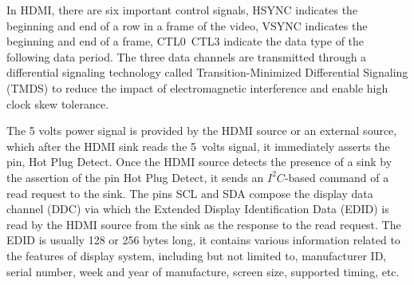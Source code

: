 \documentclass[]{spie}  %
\begin{document}

In HDMI, there are six important control signals, HSYNC indicates the beginning and end of a row in a frame of the video, VSYNC indicates the beginning and end of a frame, CTL0~CTL3 indicate the data type of the following data period. The three data channels are transmitted through a differential signaling technology called Transition-Minimized Differential Signaling (TMDS) to reduce the impact of electromagnetic interference and enable high clock skew tolerance. %

The 5 volts power signal is provided by the HDMI source or an external source, which after the HDMI sink reads the 5~volts signal, it immediately asserts the pin, Hot Plug Detect. Once the HDMI source detects the presence of a sink by the assertion of the pin Hot Plug Detect, it sends an $I^2C$-based command of a read request to the sink. The pins SCL and SDA compose the display data channel (DDC) via which the Extended Display Identification Data (EDID) is read by the HDMI source from the sink as the response to the read request. The EDID is usually 128 or 256 bytes long, it contains various information related to the features of display system, including but not limited to, manufacturer ID, serial number, week and year of manufacture, screen size, supported timing, etc.
\end{document}

